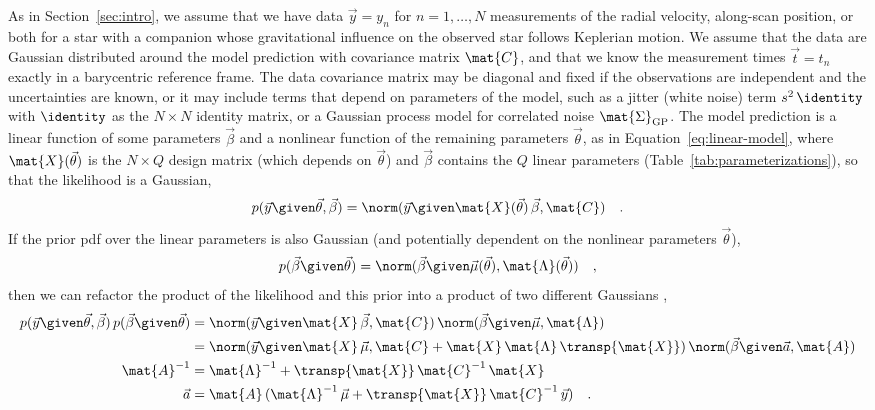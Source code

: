 \documentclass[twocolumn]{AASTeX7/aastex701}
\begin{document}
As in Section~\ref{sec:intro}, we assume that we have data $\vec{y} = y_n$ for
$n=1,\ldots,N$ measurements of the radial velocity, along-scan position, or both for a
star with a companion whose gravitational influence on the observed star follows
Keplerian motion.
We assume that the data are Gaussian distributed around the model prediction with
covariance matrix $\mat{C}$, and that we know the measurement times $\vec{t} = t_n$
exactly in a barycentric reference frame.
The data covariance matrix may be diagonal and fixed if the observations are independent
and the uncertainties are known, or it may include terms that depend on parameters of
the model, such as a jitter (white noise) term $s^2\,\identity$ with $\identity$ as the
$N \times N$ identity matrix, or a Gaussian process model for correlated noise
$\mat{\Sigma}_\mathrm{GP}$.
The model prediction is a linear function of some parameters $\vec{\beta}$ and a
nonlinear function of the remaining parameters $\vec{\theta}$, as in
Equation~\ref{eq:linear-model}, where $\mat{X}(\vec{\theta})$ is the $N \times Q$ design
matrix (which depends on $\vec{\theta}$) and $\vec{\beta}$ contains the $Q$ linear
parameters (Table~\ref{tab:parameterizations}), so that the likelihood is a Gaussian,
\begin{equation}
  p(\vec{y} \given \vec{\theta}, \vec{\beta}) =
    \norm(\vec{y} \given \mat{X}(\vec{\theta})\,\vec{\beta}, \mat{C}) \quad .
\end{equation}
If the prior pdf over the linear parameters is also Gaussian (and potentially dependent
on the nonlinear parameters $\vec{\theta}$),
\begin{equation}
  p(\vec{\beta} \given \vec{\theta}) =
    \norm(\vec{\beta} \given \vec{\mu}(\vec{\theta}), \mat{\Lambda}(\vec{\theta}))
    \quad ,
\end{equation}
then we can refactor the product of the likelihood and this prior into a product of two
different Gaussians \citep{Hogg:2020},
\begin{align}
  p(\vec{y} \given \vec{\theta}, \vec{\beta}) \, p(\vec{\beta} \given \vec{\theta}) &=
    \norm(\vec{y} \given \mat{X}\,\vec{\beta}, \mat{C})\,
      \norm(\vec{\beta} \given \vec{\mu}, \mat{\Lambda}) \\
  &= \norm(\vec{y} \given \mat{X}\,\vec{\mu},
      \mat{C} + \mat{X}\,\mat{\Lambda}\,\transp{\mat{X}})\,
    \norm(\vec{\beta} \given \vec{a}, \mat{A})
  \label{eq:refactor} \\
  \mat{A}^{-1} &= \mat{\Lambda}^{-1} + \transp{\mat{X}}\,\mat{C}^{-1}\,\mat{X} \\
  \vec{a} &= \mat{A}\,(\mat{\Lambda}^{-1}\,\vec{\mu}
    + \transp{\mat{X}}\,\mat{C}^{-1}\,\vec{y})
  \quad .
\end{align}
\end{document}
